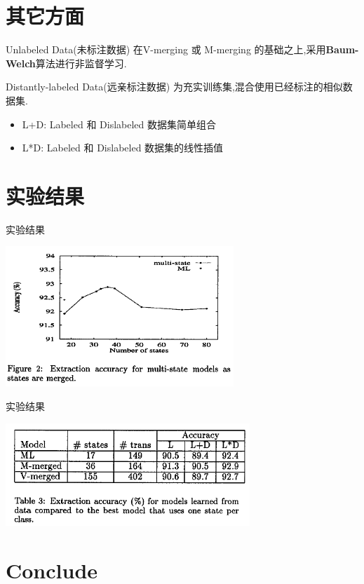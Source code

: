 \documentclass{beamer}
\begin{document}
\section{其它方面}
\begin{frame}
    \begin{block}{Unlabeled Data(未标注数据)}
        在V-merging 或 M-merging 的基础之上,采用\textbf{Baum-Welch}算法进行非监督学习. 
    \end{block}

    \begin{block}{ Distantly-labeled Data(远亲标注数据)}
        为充实训练集,混合使用已经标注的相似数据集. 
        \begin{itemize}
            \item L+D: Labeled 和 Dislabeled 数据集简单组合
            \item L*D: Labeled 和 Dislabeled 数据集的线性插值
        \end{itemize}
    \end{block}
\end{frame}

\section{实验结果}
\begin{frame}{实验结果}
    \begin{center}
        \includegraphics[height=150pt]{report5/m-picture.png}
    \end{center}
\end{frame}

\begin{frame}{实验结果}
    \begin{center}
        \includegraphics[height=110pt]{report5/m-picture2.png}
    \end{center}
\end{frame}

\section{Conclude}
\end{document}
